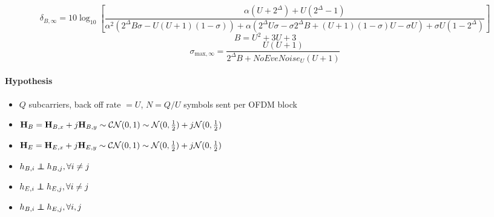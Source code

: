 \documentclass[12pt]{article}
\begin{document}
\begin{equation}
	\delta_{B,\infty} =  10 \log_{10} \left[\frac{\alpha(U+2^\Delta) + U(2^\Delta-1)}{\alpha^2(2^\Delta B\sigma-U(U+1)(1-\sigma)) + \alpha(2^\Delta U \sigma - \sigma 2^\Delta B + (U+1)(1-\sigma)U-\sigma U) + \sigma U (1-2^\Delta)} \right]
\end{equation}
\begin{equation}
	B = U^2  + 3U + 3
\end{equation}
\begin{equation}
	\sigma_{\text{max},\infty} = \frac{U(U+1)}{2^\Delta B +NoEveNoise_ U(U+1)}
\end{equation}
\paragraph*{Hypothesis}
\begin{itemize}
	\item $Q$ subcarriers, back off rate $= U$, $N = Q/U$ symbols sent per OFDM block
	\item  $\boldsymbol{\mathrm{H}}_B = \boldsymbol{\mathrm{H}}_{B,x} + j\boldsymbol{\mathrm{H}}_{B,y} \sim \mathcal{CN}(0,1) \sim \mathcal{N}(0,\frac{1}{2}) + j \mathcal{N}(0,\frac{1}{2}) $
	\item  $\boldsymbol{\mathrm{H}}_E = \boldsymbol{\mathrm{H}}_{E,x} + j\boldsymbol{\mathrm{H}}_{E,y} \sim \mathcal{CN}(0,1) \sim \mathcal{N}(0,\frac{1}{2}) + j \mathcal{N}(0,\frac{1}{2}) $
	\item $h_{B,i} \indep h_{B,j}, \forall i \neq j$
	\item $h_{E,i} \indep h_{E,j}, \forall i \neq j$
	\item $h_{B,i} \indep h_{E,j}, \forall i,j$
\end{itemize}
\end{document}
